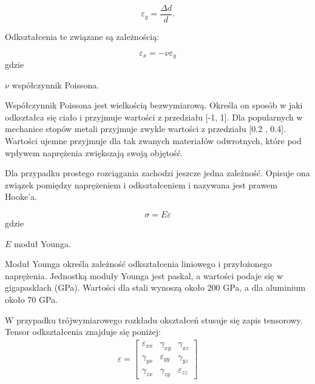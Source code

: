 \begin{equation}
\varepsilon_y=\frac{\Delta d}{d}.
\end{equation}

	Odkształcenia te związane są zależnością:

\begin{equation}
\varepsilon_x=-\nu \varepsilon_y
\end{equation}
gdzie
\begin{eqwhere}[2cm]
        \item[$\nu$] współczynnik Poissona.
\end{eqwhere}

	Współczynnik Poissona jest wielkością bezwymiarową. Określa on sposób w jaki odkształca się ciało i przyjmuje wartości z przedziału [-1, 1]. Dla popularnych w mechanice stopów metali przyjmuje zwykle wartości z przedziału [0.2 , 0.4]. Wartości ujemne przyjmuje dla tak zwanych materiałów odwrotnych, które pod wpływem naprężenia zwiększają swoją objętość.

	Dla przypadku prostego rozciągania zachodzi jeszcze jedna zależność. Opisuje ona związek pomiędzy naprężeniem i odkształceniem i nazywana jest prawem Hooke'a.

\begin{equation}
\sigma=E\varepsilon
\end{equation}
gdzie
\begin{eqwhere}[2cm]
        \item[$E$] moduł Younga.
\end{eqwhere}

	Moduł Younga określa zależność odkształcenia liniowego i przyłożonego naprężenia. Jednostką moduły Younga jest paskal, a wartości podaje się w gigapasklach (GPa). Wartości dla stali wynoszą około 200 GPa, a dla aluminium około 70 GPa.

	W przypadku trójwymiarowego rozkładu okształceń stusuje się zapis tensorowy. Tensor odkształcenia znajduje się poniżej:
\begin{gather}
	\varepsilon=\begin{bmatrix} 
	  \varepsilon_{xx}    & \gamma_{xy} & \gamma_{xz} \\ 
	  \gamma_{yx} & \varepsilon_{yy} & \gamma_{yz} \\
	  \gamma_{zx} & \gamma_{zy} & \varepsilon_{zz} 
	\end{bmatrix}
\end{gather}



